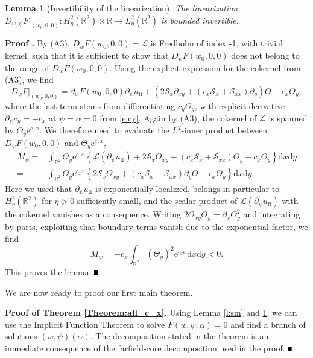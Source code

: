 \documentclass[10pt]{article}
\newtheorem{Lemma}{Lemma}[section]
\newenvironment{Proof}[1][\unskip]%
 {\begin{trivlist} \item[]{\bf Proof #1. }}%
 {\hspace*{\fill}$\rule{.4\baselineskip}{.4\baselineskip}$\end{trivlist}}
\newcommand{\R}{\mathbb{R}}
\newcommand{\rmd}{\mathrm{d}}
\newcommand{\rme}{\mathrm{e}}
\begin{document}
\begin{Lemma}[Invertibility of the linearization]\label{l:inv}
The linearization $D_{w,\psi}F|_{(w_0,0,0)}:H^2_\eta(\R^2)\times\R\to L^2_\eta(\R^2)$ is bounded invertible.
\end{Lemma}
\begin{Proof}
By (A3), $D_wF(w_0,0,0)=\mathscr{L}$ is Fredholm of index -1, with trivial kernel, such that it is sufficient to show that $D_\psi F(w_0,0,0)$ does not belong to the range of $D_wF(w_0,0,0)$. Using the explicit expression for the cokernel from (A3), we find
\[
D_{\psi}F|_{(w_0,0,0)}=\partial_wF(w_0,0,0)\partial_\psi u_\mathrm{ff}+\left(2 \mathcal{S}_x \partial_{x y} +  (c_x \mathcal{S}_x + \mathcal{S}_{xx})\partial_{y}\right)\Theta-c_x\Theta_y,
\]
where the last term stems from differentiating $c_y\Theta_y$, with explicit derivative $\partial_\psi c_y=-c_x$ at $\psi=\alpha=0$ from \eqref{e:cy}. 
Again by (A3), the cokernel of $\mathscr{L}$ is spanned by $\Theta_y\rme^{c_x x}$. We therefore need to evaluate the $L^2$-inner product between $D_\psi F(w_0,0,0)$ and $\Theta_y\rme^{c_x x}$,
\begin{align*}
M_\psi=&\int_{\R^2} \Theta_y \rme^{c_x x} \left\{\mathscr{L}(\partial_\psi u_\mathrm{ff})+2 \mathcal{S}_x \Theta_{xy}  +  (c_x \mathcal{S}_x + \mathcal{S}_{xx})\Theta_y-c_x\Theta_y\right\}\rmd x\rmd y\\
=&\int_{\R^2} \Theta_y \rme^{c_x x} \left\{2 \mathcal{S}_x \Theta_{xy} +  (c_x \mathcal{S}_x + \mathcal{S}_{xx})\partial_{y}\Theta-c_x\Theta_y\right\}\rmd x\rmd y.
\end{align*}
Here we used that $\partial_\psi u_\mathrm{ff}$ is exponentially localized, belongs in particular to $H^2_\eta(\R^2)$ for $\eta>0$ sufficiently small, and the scalar product of $\mathscr{L}(\partial_\psi u_\mathrm{ff})$ with the cokernel vanishes as a consequence. Writing $2\Theta_{xy} \Theta_y=\partial_x\Theta_y^2$ and integrating by parts, exploiting that boundary terms vanish due to the exponential factor, we find 
\begin{equation}\label{e:mel}
M_\psi=-c_x\int_{\R^2}\left(\Theta_y\right)^2\rme^{c_x x}\rmd x \rmd y<0.
\end{equation}
This proves the lemma. 
\end{Proof}
We are now ready to proof our first main theorem. 
\begin{Proof}[of Theorem \ref{Theorem:all_c_x}]
Using Lemma \ref{l:sm} and \ref{l:inv}, we can use the Implicit Function Theorem to solve $F(w,\psi,\alpha)=0$ and find a branch of solutions $(w,\psi)(\alpha)$. The decomposition stated in the theorem is an immediate consequence of the farfield-core decomposition used in the proof. 
\end{Proof}
\end{document}
